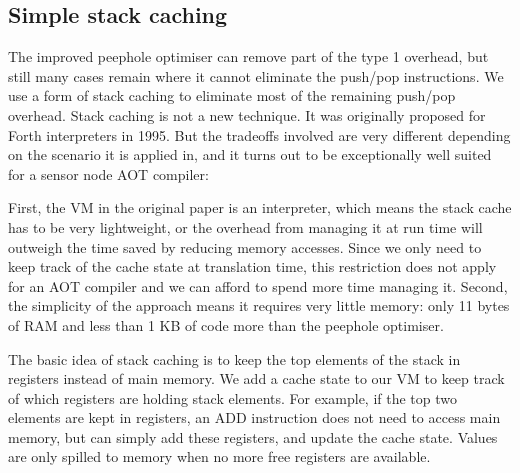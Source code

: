 
\subsection{Simple stack caching}
\label{sec-optimisations-simple-stack-caching}


The improved peephole optimiser can remove part of the type 1 overhead, but still many cases remain where it cannot eliminate the push/pop instructions. We use a form of stack caching \cite{Ertl:1995dv} to eliminate most of the remaining push/pop overhead. Stack caching is not a new technique. It was originally proposed for Forth interpreters in 1995. But the tradeoffs involved are very different depending on the scenario it is applied in, and it turns out to be exceptionally well suited for a sensor node AOT compiler:

First, the VM in the original paper is an interpreter, which means the stack cache has to be very lightweight, or the overhead from managing it at run time will outweigh the time saved by reducing memory accesses. Since we only need to keep track of the cache state at translation time, this restriction does not apply for an AOT compiler and we can afford to spend more time managing it. Second, the simplicity of the approach means it requires very little memory: only 11 bytes of RAM and less than 1 KB of code more than the peephole optimiser.

The basic idea of stack caching is to keep the top elements of the stack in registers instead of main memory. We add a cache state to our VM to keep track of which registers are holding stack elements. For example, if the top two elements are kept in registers, an ADD instruction does not need to access main memory, but can simply add these registers, and update the cache state. Values are only spilled to memory when no more free registers are available.

